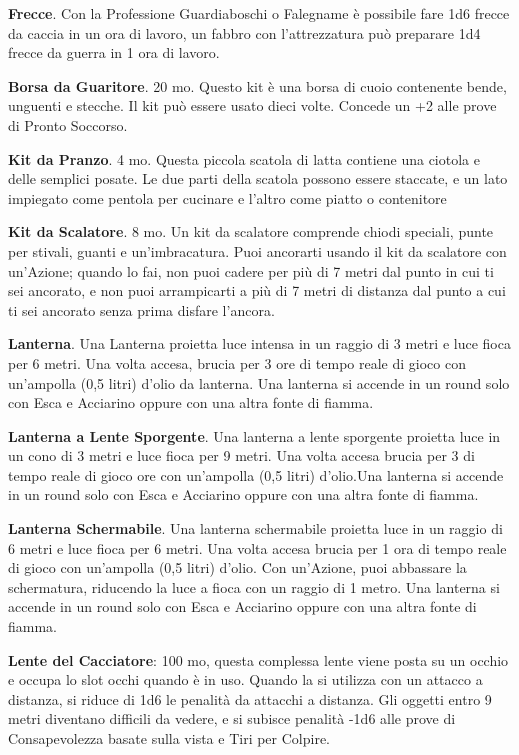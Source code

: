 \begin{multicols}{2}
\textbf{Frecce}. Con la Professione Guardiaboschi o Falegname è possibile fare 1d6 frecce da caccia in un ora di lavoro, un fabbro con l'attrezzatura può preparare 1d4 frecce da guerra in 1 ora di lavoro.

\textbf{Borsa da Guaritore}. 20 mo. \label{borsadaguaritore}\hypertarget{borsadaguaritore}{} Questo kit è una borsa di cuoio contenente bende, unguenti e stecche. Il kit può essere usato dieci volte. Concede un +2 alle prove di Pronto Soccorso.

\textbf{Kit da Pranzo}. 4 mo. Questa piccola scatola di latta contiene una ciotola e delle semplici posate. Le due parti della scatola possono essere staccate, e un lato impiegato come pentola per cucinare e l'altro come piatto o contenitore

\textbf{Kit da Scalatore}. 8 mo. Un kit da scalatore comprende chiodi speciali, punte per stivali, guanti e un'imbracatura. Puoi ancorarti usando il kit da scalatore con un'Azione; quando lo fai, non puoi cadere per più di 7 metri dal punto in cui ti sei ancorato, e non puoi arrampicarti a più di 7 metri di distanza dal punto a cui ti sei ancorato senza prima disfare l'ancora.

\textbf{Lanterna}\label{Lanterna}\hypertarget{Lanterna}{}. Una Lanterna proietta luce intensa in un raggio di 3 metri e luce fioca per 6 metri. Una volta accesa, brucia per 3 ore di tempo reale di gioco con un'ampolla (0,5 litri) d'olio da lanterna. Una lanterna si accende in un round solo con Esca e Acciarino oppure con una altra fonte di fiamma.

\textbf{Lanterna a Lente Sporgente}. Una lanterna a lente sporgente proietta luce in un cono di 3 metri e luce fioca per 9 metri. Una volta accesa brucia per 3 di tempo reale di gioco ore con un'ampolla (0,5 litri) d'olio.Una lanterna si accende in un round solo con Esca e Acciarino oppure con una altra fonte di fiamma.

\textbf{Lanterna Schermabile}. Una lanterna schermabile proietta luce in un raggio di 6 metri e luce fioca per 6 metri. Una volta accesa brucia per 1 ora di tempo reale di gioco con un'ampolla (0,5 litri) d'olio. Con un'Azione, puoi abbassare la schermatura, riducendo la luce a fioca con un raggio di 1 metro. Una lanterna si accende in un round solo con Esca e Acciarino oppure con una altra fonte di fiamma.

\textbf{Lente del Cacciatore}: 100 mo, questa complessa lente viene posta su un occhio e occupa lo slot occhi quando è in uso. Quando la si utilizza con un attacco a distanza, si riduce di 1d6 le penalità da attacchi a distanza. Gli oggetti entro 9 metri diventano difficili da vedere, e si subisce penalità -1d6 alle prove di Consapevolezza basate sulla vista e Tiri per Colpire.


\end{multicols}
